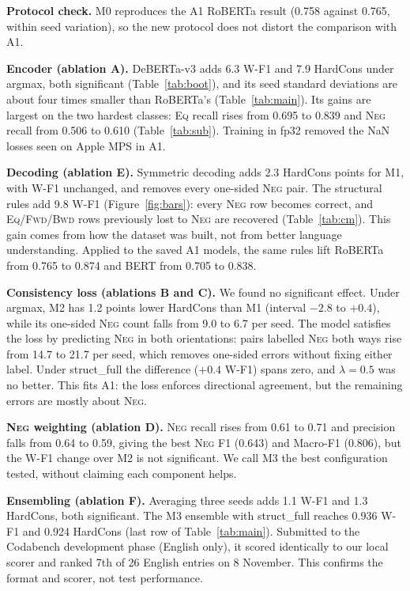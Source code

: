 \documentclass[10pt,a4paper,twocolumn]{article}
\newcommand{\Eq}{\textsc{Eq}}
\newcommand{\Fwd}{\textsc{Fwd}}
\newcommand{\Bwd}{\textsc{Bwd}}
\newcommand{\Neg}{\textsc{Neg}}
\begin{document}
\textbf{Protocol check.} M0 reproduces the A1 RoBERTa result (0.758 against 0.765, within seed variation), so the new protocol does not distort the comparison with A1.

\textbf{Encoder (ablation A).} DeBERTa-v3 adds 6.3 W-F1 and 7.9 HardCons under argmax, both significant (Table~\ref{tab:boot}), and its seed standard deviations are about four times smaller than RoBERTa's (Table~\ref{tab:main}). Its gains are largest on the two hardest classes: \Eq{} recall rises from 0.695 to 0.839 and \Neg{} recall from 0.506 to 0.610 (Table~\ref{tab:sub}). Training in fp32 removed the NaN losses seen on Apple MPS in A1.

\textbf{Decoding (ablation E).} Symmetric decoding adds 2.3 HardCons points for M1, with W-F1 unchanged, and removes every one-sided \Neg{} pair. The structural rules add 9.8 W-F1 (Figure~\ref{fig:bars}): every \Neg{} row becomes correct, and \Eq/\Fwd/\Bwd{} rows previously lost to \Neg{} are recovered (Table~\ref{tab:cm}). This gain comes from how the dataset was built, not from better language understanding. Applied to the saved A1 models, the same rules lift RoBERTa from 0.765 to 0.874 and BERT from 0.705 to 0.838.

\textbf{Consistency loss (ablations B and C).} We found no significant effect. Under argmax, M2 has 1.2 points lower HardCons than M1 (interval $-2.8$ to $+0.4$), while its one-sided \Neg{} count falls from 9.0 to 6.7 per seed. The model satisfies the loss by predicting \Neg{} in both orientations: pairs labelled \Neg{} both ways rise from 14.7 to 21.7 per seed, which removes one-sided errors without fixing either label. Under struct\_full the difference ($+0.4$ W-F1) spans zero, and $\lambda=0.5$ was no better. This fits A1: the loss enforces directional agreement, but the remaining errors are mostly about \Neg.

\textbf{\Neg{} weighting (ablation D).} \Neg{} recall rises from 0.61 to 0.71 and precision falls from 0.64 to 0.59, giving the best \Neg{} F1 (0.643) and Macro-F1 (0.806), but the W-F1 change over M2 is not significant. We call M3 the best configuration tested, without claiming each component helps.

\textbf{Ensembling (ablation F).} Averaging three seeds adds 1.1 W-F1 and 1.3 HardCons, both significant. The M3 ensemble with struct\_full reaches 0.936 W-F1 and 0.924 HardCons (last row of Table~\ref{tab:main}). Submitted to the Codabench development phase (English only), it scored identically to our local scorer and ranked 7th of 26 English entries on 8 November. This confirms the format and scorer, not test performance.
\end{document}
